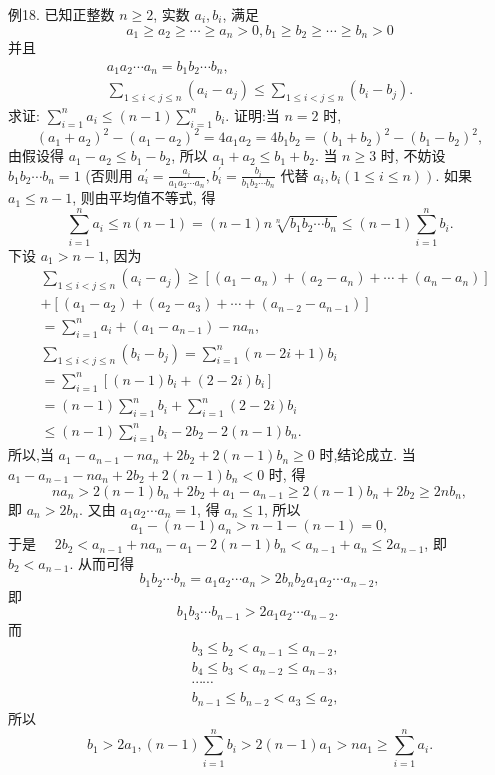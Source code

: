 例18. 已知正整数 $n \geqslant 2$, 实数 $a_i, b_i$, 满足
$$
a_1 \geqslant a_2 \geqslant \cdots \geqslant a_n>0, b_1 \geqslant b_2 \geqslant \cdots \geqslant b_n>0
$$
并且
$$
\begin{gathered}
a_1 a_2 \cdots a_n=b_1 b_2 \cdots b_n, \\
\sum_{1 \leqslant i<j \leqslant n}\left(a_i-a_j\right) \leqslant \sum_{1 \leqslant i<j \leqslant n}\left(b_i-b_j\right) .
\end{gathered}
$$
求证: $\sum_{i=1}^n a_i \leqslant(n-1) \sum_{i=1}^n b_i$.
证明:当 $n=2$ 时,
$$
\left(a_1+a_2\right)^2-\left(a_1-a_2\right)^2=4 a_1 a_2=4 b_1 b_2=\left(b_1+b_2\right)^2-\left(b_1-b_2\right)^2,
$$
由假设得 $a_1-a_2 \leqslant b_1-b_2$, 所以 $a_1+a_2 \leqslant b_1+b_2$.
当 $n \geqslant 3$ 时, 不妨设 $b_1 b_2 \cdots b_n=1$ (否则用 $a_i^{\prime}=\frac{a_i}{a_1 a_2 \cdots a_n}, b_i^{\prime}=\frac{b_i}{b_1 b_2 \cdots b_n}$ 代替 $\left.a_i, b_i(1 \leqslant i \leqslant n)\right)$.
如果 $a_1 \leqslant n-1$, 则由平均值不等式, 得
$$
\sum_{i=1}^n a_i \leqslant n(n-1)=(n-1) n \sqrt[n]{b_1 b_2 \cdots b_n} \leqslant(n-1) \sum_{i=1}^n b_i .
$$
下设 $a_1>n-1$, 因为
$$
\begin{aligned}
& \sum_{1 \leqslant i<j \leqslant n}\left(a_i-a_j\right) \geqslant {\left[\left(a_1-a_n\right)+\left(a_2-a_n\right)+\cdots+\left(a_n-a_n\right)\right] } \\
&+\left[\left(a_1-a_2\right)+\left(a_2-a_3\right)+\cdots+\left(a_{n-2}-a_{n-1}\right)\right] \\
&= \sum_{i=1}^n a_i+\left(a_1-a_{n-1}\right)-n a_n, \\
& \sum_{1 \leqslant i<j \leqslant n}\left(b_i-b_j\right)=\sum_{i=1}^n(n-2 i+1) b_i \\
&=\sum_{i=1}^n\left[(n-1) b_i+(2-2 i) b_i\right] \\
&=(n-1) \sum_{i=1}^n b_i+\sum_{i=1}^n(2-2 i) b_i \\
& \leqslant(n-1) \sum_{i=1}^n b_i-2 b_2-2(n-1) b_n .
\end{aligned}
$$
所以,当 $a_1-a_{n-1}-n a_n+2 b_2+2(n-1) b_n \geqslant 0$ 时,结论成立.
当 $a_1-a_{n-1}-n a_n+2 b_2+2(n-1) b_n<0$ 时, 得
$$
n a_n>2(n-1) b_n+2 b_2+a_1-a_{n-1} \geqslant 2(n-1) b_n+2 b_2 \geqslant 2 n b_n,
$$
即 $a_n>2 b_n$.
又由 $a_1 a_2 \cdots a_n=1$, 得 $a_n \leqslant 1$, 所以
$$
a_1-(n-1) a_n>n-1-(n-1)=0,
$$
于是 $\quad 2 b_2<a_{n-1}+n a_n-a_1-2(n-1) b_n<a_{n-1}+a_n \leqslant 2 a_{n-1}$,
即 $b_2<a_{n-1}$. 从而可得
$$
b_1 b_2 \cdots b_n=a_1 a_2 \cdots a_n>2 b_n b_2 a_1 a_2 \cdots a_{n-2},
$$
即
$$
b_1 b_3 \cdots b_{n-1}>2 a_1 a_2 \cdots a_{n-2} \text {. }
$$
而
$$
\begin{aligned}
& b_3 \leqslant b_2<a_{n-1} \leqslant a_{n-2}, \\
& b_4 \leqslant b_3<a_{n-2} \leqslant a_{n-3}, \\
& \cdots \cdots \\
& b_{n-1} \leqslant b_{n-2}<a_3 \leqslant a_2,
\end{aligned}
$$
所以
$$
b_1>2 a_1,(n-1) \sum_{i=1}^n b_i>2(n-1) a_1>n a_1 \geqslant \sum_{i=1}^n a_i .
$$



